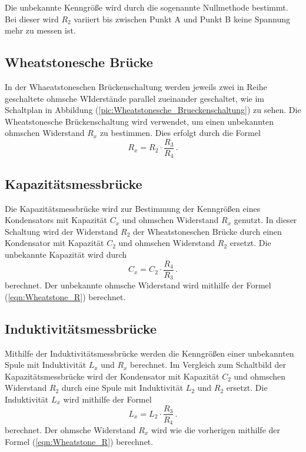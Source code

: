     Die unbekannte Kenngröße wird durch die sogenannte Nullmethode bestimmt. Bei dieser wird $R_2$ variiert bis zwischen Punkt A und Punkt B keine Spannung mehr zu
    messen ist. 
    \subsection{Wheatstonesche Brücke}
    In der Whaeatstoneschen Brückenschaltung werden jeweils zwei in Reihe geschaltete ohmsche WIderstände parallel zueinander geschaltet, wie im Schaltplan in Abbildung 
    (\ref{pic:Wheatstonesche_Brueckenschaltung}) zu sehen. 
    Die Wheatstonesche Brückenschaltung wird verwendet, um einen unbekannten ohmschen Widerstand $R_x$ zu bestimmen. Dies erfolgt durch die Formel 
    \begin{equation}
        \label{eqn:Wheatstone_R}
        R_x = R_2 \cdot \frac{R_3}{R_4} \,.
    \end{equation}
    \subsection{Kapazitätsmessbrücke}
    Die Kapazitätsmessbrücke wird zur Bestimmung der Kenngrößen eines Kondensators mit Kapazität $C_x$ und ohmschen Widerstand $R_x$ genutzt. In dieser Schaltung 
    wird der Widerstand $R_2$ der Wheatstoneschen Brücke durch einen Kondensator mit Kapazität $C_2$ und ohmschen Widerstand $R_2$ ersetzt. Die unbekannte Kapazität
    wird durch 
    \begin{equation}
        \label{eqn:Kapazitaet_C}
        C_x = C_2 \cdot \frac{R_4}{R_3} \,.
    \end{equation}
    berechnet. Der unbekannte ohmsche Widerstand wird mithilfe der Formel (\ref{eqn:Wheatstone_R})
    berechnet. 

    \subsection{Induktivitätsmessbrücke}
    Mithilfe der Induktivitätsmessbrücke werden die Kenngrößen einer unbekannten Spule mit Induktivität $L_x$ und $R_x$ berechnet. Im Vergleich zum Schaltbild der Kapazitätsmessbrücke
    wird der Kondensator mit Kapazität $C_2$ und ohmschen Widerstand $R_2$ durch eine Spule mit Induktivität $L_2$ und $R_2$ ersetzt. Die Induktivität $L_x$ wird 
    mithilfe der Formel 
    \begin{equation}
        \label{eqn:Induktivität_L}
        L_x = L_2 \cdot \frac{R_3}{R_4} \,.
    \end{equation}
    berechnet. Der ohmsche Widerstand $R_x$ wird wie die vorherigen mithilfe der Formel (\ref{eqn:Wheatstone_R}) berechnet. 
